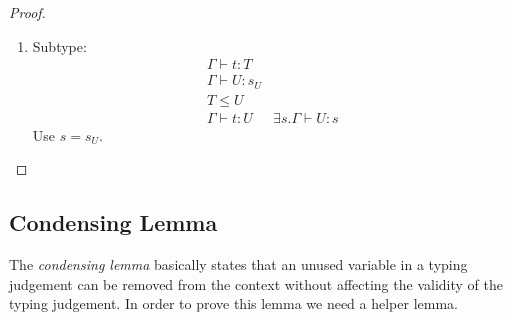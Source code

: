 \begin{theorem}
\begin{proof}
\begin{enumerate}
\begin{enumerate}
                \item Subtype:
                $$
                \begin{array}{l|l}
                    \Gamma \vdash t : T
                    \\
                    \Gamma \vdash U: s_U
                    \\
                    T \le U
                    \\
                    \hline
                    \Gamma \vdash t: U
                    &
                    \exists s. \Gamma \vdash U: s
                \end{array}
                $$
                Use $s = s_U$.

            \end{enumerate}
        \end{enumerate}
    \end{proof}
\end{theorem}




\subsection{Condensing Lemma}

The \emph{condensing lemma} basically states that an unused variable in a typing
judgement can be removed from the context without affecting the validity of the
typing judgement. In order to prove this lemma we need a helper lemma.

